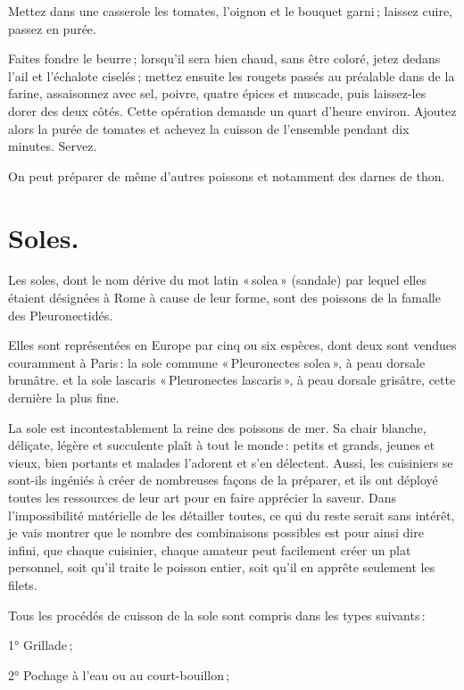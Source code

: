 Mettez dans une casserole les tomates, l'oignon et le bouquet garni ; laissez
cuire, passez en purée.

Faites fondre le beurre ; lorsqu'il sera bien chaud, sans être coloré, jetez
dedans l'ail et l'échalote ciselés ; mettez ensuite les rougets passés au
préalable dans de la farine, assaisonnez avec sel, poivre, quatre épices et
muscade, puis laissez-les dorer des deux côtés. Cette opération demande un
quart d'heure environ. Ajoutez alors la purée de tomates et achevez la cuisson
de l'ensemble pendant dix minutes. Servez.

\sk

On peut préparer de même d'autres poissons et notamment des darnes de thon.

\section*{\centering Soles.}

Les soles, dont le nom dérive du mot latin « solea » (sandale) par lequel elles
étaient désignées à Rome à cause de leur forme, sont des poissons de la famalle
des Pleuronectidés.

Elles sont représentées en Europe par cinq ou six espèces, dont deux sont
vendues couramment à Paris : la sole commune « Pleuronectes solea », à peau
dorsale brunâtre. et la sole lascaris « Pleuronectes lascaris », à peau dorsale
grisâtre, cette dernière la plus fine.

La sole est incontestablement la reine des poissons de mer. Sa chair blanche,
déliçate, légère et succulente plaît à tout le monde : petits et grands, jeunes
et vieux, bien portants et malades l’adorent et s'en délectent. Aussi, les
cuisiniers se sont-ils ingéniés à créer de nombreuses façons de la préparer, et
ils ont déployé toutes les ressources de leur art pour en faire apprécier la
saveur. Dans l'impossibilité matérielle de les détailler toutes, ce qui du
reste serait sans intérêt, je vais montrer que le nombre des combinaisons
possibles est pour ainsi dire infini, que chaque cuisinier, chaque amateur peut
facilement créer un plat personnel, soit qu'il traite le poisson entier, soit
qu'il en apprête seulement les filets.

Tous les procédés de cuisson de la sole sont compris dans les types suivants :

1° Grillade ;

2° Pochage à l'eau ou au court-bouillon ;

